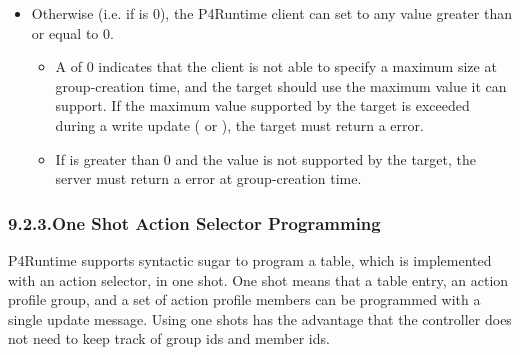 \documentclass[11pt]{article}
\begin{document}
{\begin{itemize}
\item{}
Otherwise (i.e. if  is 0), the P4Runtime client can set
 to any value greater than or equal to 0.%

\begin{itemize}%

\item{}
A  of 0 indicates that the client is not able to specify a maximum
size at group-creation time, and the target should use the maximum value it
can support. If the maximum value supported by the target is exceeded during
a write update ( or ), the target must return a
 error.%

\item{}
If  is greater than 0 and the value is not supported by the
target, the server must return a  error at
group-creation time.%
\end{itemize}%
\end{itemize}%

\subsubsection{9.2.3.\hspace*{0.5em}One Shot Action Selector Programming}\label{sec-oneshot}%

\noindent{}P4Runtime supports syntactic sugar to program a table, which is implemented with
an action selector, in one shot. One shot means that a table entry, an action
profile group, and a set of action profile members can be programmed with a
single update message. Using one shots has the advantage that the controller
does not need to keep track of group ids and member ids.%

}
\end{document}
